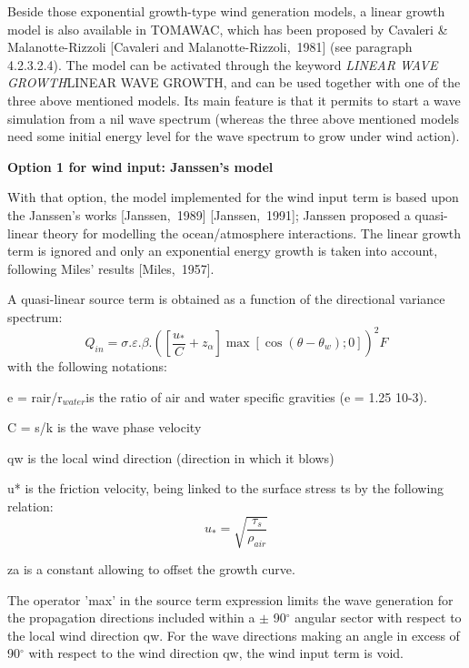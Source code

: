  Beside those exponential growth-type wind generation models, a linear growth model is also available in TOMAWAC, which has been proposed by Cavaleri \& Malanotte-Rizzoli [Cavaleri and Malanotte-Rizzoli,~1981] (see paragraph 4.2.3.2.4). The model can be activated through the keyword \textit{LINEAR WAVE GROWTH}LINEAR WAVE GROWTH, and can be used together with one of the three above mentioned models. Its main feature is that it permits to start a wave simulation from a nil wave spectrum (whereas the three above mentioned models need some initial energy level for the wave spectrum to grow under wind action).


{\bf  Option 1 for wind input: Janssen's model}

 With that option, the model implemented for the wind input term is based upon the Janssen's works [Janssen,~1989] [Janssen,~1991]; Janssen proposed a quasi-linear theory for modelling the ocean/atmosphere interactions. The linear growth term is ignored and only an exponential energy growth is taken into account, following Miles' results [Miles,~1957].

 A quasi-linear source term is obtained as a function of the directional variance spectrum:
\begin{equation} \label{GrindEQ__4_27_}
Q_{in} =\sigma .\varepsilon .\beta .\left(\left[\frac{u_{*} }{C} +z_{\alpha } \right]\max \left[\cos (\theta -\theta _{w} );0\right]\right)^{2} F
\end{equation}
with the following notations:

 e = rair/r${}_{water }$is the ratio of air and water specific gravities (e = 1.25 10-3).

 C = s/k is the wave phase velocity

 qw is the local wind direction (direction in which it blows)

 u* is the friction velocity, being linked to the surface stress ts by the following relation:
\begin{equation} \label{GrindEQ__4_28_}
u_{*} =\sqrt{\frac{\tau _{s} }{\rho _{air} } }
\end{equation}

 za is a constant allowing to offset the growth curve.

 The operator 'max' in the source term expression limits the wave generation for the propagation directions included within a $\pm$ 90${}^\circ$ angular sector with respect to the local wind direction qw. For the wave directions making an angle in excess of 90${}^\circ$ with respect to the wind direction qw, the wind input term is void.

